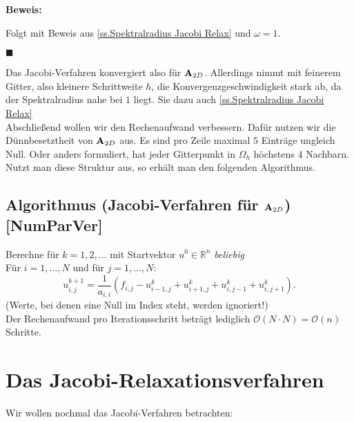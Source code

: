 \textbf{Beweis:}\label{b.Spektral Jacobi}

Folgt mit Beweis aus \autoref{ss.Spektralradius Jacobi Relax} und $\omega = 1$.
\begin{flushright}
$\blacksquare$
\end{flushright}

Das Jacobi-Verfahren konvergiert also für ${\textbf{A}}_{2D}$. Allerdings nimmt mit feinerem Gitter, also kleinere Schrittweite $h$, die Konvergenzgeschwindigkeit stark ab, da der Spektralradius nahe bei $1$ liegt. Sie dazu auch \autoref{ss.Spektralradius Jacobi Relax}\\
Abschließend wollen wir den Rechenaufwand verbessern. Dafür nutzen wir die Dünnbesetztheit von ${\textbf{A}}_{2D}$ aus. Es sind pro Zeile maximal $5$ Einträge ungleich Null. Oder anders formuliert, hat jeder Gitterpunkt in $\Omega_{h}$ höchstens 4 Nachbarn. Nutzt man diese Struktur aus, so erhält man den folgenden Algorithmus. 

\subsection{Algorithmus (Jacobi-Verfahren für ${\textbf{A}}_{2D}$) [NumParVer]}\label{ss.Jacobi für Poisson}

Berechne für $k = 1,2,...$ mit Startvektor $u^{0} \in \mathbb{R}^{n}$ \textit{beliebig}\\
Für $i = 1,...,N$ und für $j = 1,...,N$:
\begin{equation}
u^{k+1}_{i,j} =  \frac {1} {a_{i,i}} (f_{i,j} - u^{k}_{i-1,j} + u^{k}_{i+1,j} + u^{k}_{i,j-1} + u^{k}_{i,j+1}).
\end{equation}
(Werte, bei denen eine Null im Index steht, werden ignoriert!)\\
Der Rechenaufwand pro Iterationsschritt beträgt lediglich $\mathcal{O}(N \cdot N)=\mathcal{O}(n)$ Schritte.

\section{Das Jacobi-Relaxationsverfahren}\label{s.Jacobi Relaxation}

Wir wollen nochmal das Jacobi-Verfahren betrachten:


